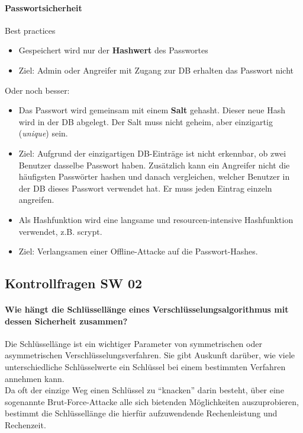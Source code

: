 \documentclass[10pt,a4paper]{article}
\begin{document}
\paragraph*{Passwortsicherheit}Best practices
\begin{itemize}[noitemsep,topsep=0pt,leftmargin=*]
    \item Gespeichert wird nur der \textbf{Hashwert} des Passwortes
    \item Ziel: Admin oder Angreifer mit Zugang zur DB erhalten das Passwort nicht
\end{itemize}
Oder noch besser:
\begin{itemize}[noitemsep,topsep=0pt,leftmargin=*]
     \item Das Passwort wird gemeinsam mit einem \textbf{Salt} gehasht. Dieser neue Hash wird in der DB abgelegt. Der Salt muss nicht geheim, aber einzigartig (\textsl{unique}) sein.
    \item Ziel: Aufgrund der einzigartigen DB-Einträge ist nicht erkennbar, ob zwei Benutzer dasselbe Passwort haben. Zusätzlich kann ein Angreifer nicht die häufigsten Passwörter hashen und danach vergleichen, welcher Benutzer in der DB dieses Passwort verwendet hat. Er muss jeden Eintrag einzeln angreifen.
    \item Als Hashfunktion wird eine langsame und resourcen-intensive Hashfunktion verwendet, z.B. scrypt.
    \item Ziel: Verlangsamen einer Offline-Attacke auf die Passwort-Hashes.
\end{itemize}

\subsection*{Kontrollfragen SW 02}
\paragraph*{Wie hängt die Schlüssellänge eines Verschlüsselungsalgorithmus mit dessen Sicherheit
zusammen?}Die Schlüssellänge ist ein wichtiger Parameter von symmetrischen oder asymmetrischen Verschlüsselungsverfahren. Sie gibt Auskunft darüber, wie viele unterschiedliche Schlüsselwerte ein Schlüssel bei einem bestimmten Verfahren annehmen kann.\\
Da oft der einzige Weg einen Schlüssel zu "`knacken"' darin besteht, über eine sogenannte Brut-Force-Attacke alle sich bietenden Möglichkeiten auszuprobieren, bestimmt die Schlüssellänge die hierfür aufzuwendende Rechenleistung und Rechenzeit.
\end{document}
